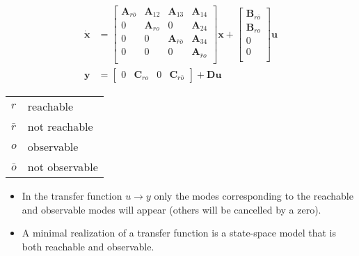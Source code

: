 \begin{align*}
    \dot{\mathbf{x}} & = \begin{bmatrix}
                             \mathbf{A}_{r\bar{o}} & \mathbf{A}_{12} & \mathbf{A}_{13}             & \mathbf{A}_{14}       \\
                             0                     & \mathbf{A}_{ro} & 0                           & \mathbf{A}_{24}       \\
                             0                     & 0               & \mathbf{A}_{\bar{r}\bar{o}} & \mathbf{A}_{34}       \\
                             0                     & 0               & 0                           & \mathbf{A}_{\bar{r}o} \\
                         \end{bmatrix}
    \mathbf{x} + \begin{bmatrix}
                     \mathbf{B}_{r\bar{o}} \\
                     \mathbf{B}_{ro}       \\
                     0                     \\
                     0                     \\
                 \end{bmatrix}
    \mathbf{u}                                                                                                         \\
    \mathbf{y}       & = \begin{bmatrix}
                             0 & \mathbf{C}_{ro} & 0 & \mathbf{C}_{r\bar{o}}
                         \end{bmatrix}
    + \mathbf{Du}
\end{align*}

\newpar{}

\begin{tabularx}{\linewidth}{@{}ll@{}}
    $r$       & reachable      \\
    $\bar{r}$ & not reachable  \\
    $o$       & observable     \\
    $\bar{o}$ & not observable \\
\end{tabularx}

\begin{itemize}
    \item In the transfer function $u \rightarrow y$ only the modes corresponding to the reachable and observable modes will appear (others will be cancelled by a zero).
    \item A minimal realization of a transfer function is a state-space model that is both reachable and observable.
\end{itemize}